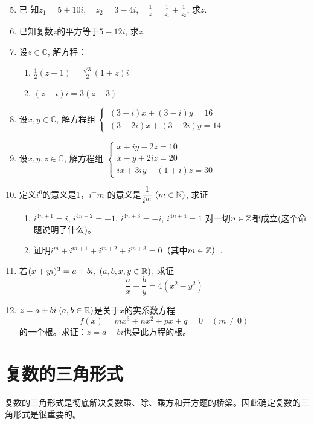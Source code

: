\begin{enumerate}\setcounter{enumi}{4}
    \item 已 知$z_{1}= 5+ 10i,\quad z_{2}= 3- 4i,\quad \frac 1z= \frac 1{z_{1}}+ \frac 1{z_{2}}$, 求$z$.
    \item 已知复数$z$的平方等于$5-12i$, 求$z$.
    \item 设$z\in \mathbb{C}$, 解方程：
\begin{multicols}{2}
\begin{enumerate}[(1)]
    \item $\frac 12 ( z- 1) = \frac {\sqrt {3}}2 ( 1+ z) i$
    \item $(z-i)i=3(z-3)$ 
\end{enumerate}
\end{multicols}

\item 设$x,y\in \mathbb{C}$, 解方程组
    $\begin{cases}
        (3+i)x+(3-i)y=16 \\
        (3+2i)x+(3-2i)y=14
    \end{cases}$
\item 设$x,y,z\in \mathbb{C}$, 解方程组
    $\begin{cases}
        x+iy-2z=10\\
        x-y+2iz=20\\
        ix+3iy-(1+i)z=30
    \end{cases}$
\item 定义$i^0$的意义是1，$i^-m$ 的意义是$\dfrac1{i^m}\; (m\in \mathbb{N})$, 求证
\begin{enumerate}[(1)]
\item $i^{4n+ 1}= i$, $i^{4n+ 2}= - 1$, $i^{4n+ 3}= - i$, $i^{4n+ 4}= 1$
    对一切$n\in \mathbb{Z}$都成立(这个命题说明了什么)。
\item 证明$i^m+i^{m+1}+i^{m+2}+i^{m+3}=0$（其中$m\in \mathbb{Z}$）.
\end{enumerate}
    
\item 若$(x+yi)^3=a+bi,\; (a,b,x,y\in \mathbb{R})$, 求证
    $$\frac ax+\frac by=4(x^2-y^2)$$
\item $z=a+bi\; (a,b\in \mathbb{R})$是关于$x$的实系数方程
    $$f(x)=mx^3+nx^2+px+q=0\quad (m\neq0)$$
    的一个根。求证：$\bar{z}=a-bi$也是此方程的根。

\end{enumerate}

\section{复数的三角形式}
复数的三角形式是彻底解决复数乘、除、乘方和开方题的桥梁。因此确定复数的三角形式是很重要的。

